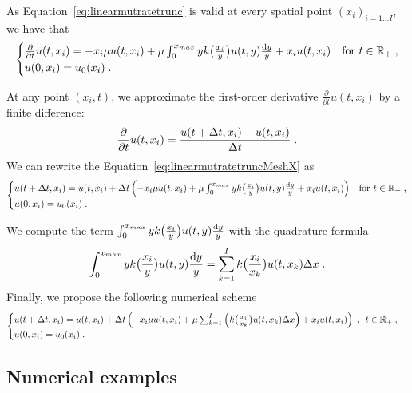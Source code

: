 \documentclass[11pt]{amsart}
\begin{document}
As Equation~\eqref{eq:linearmutratetrunc} is valid at every spatial point $(x_i)_{i = 1 \ldots I}$, we have that
\begin{equation}
    \begin{cases}
    \frac{\partial}{\partial t}u(t,x_i) = - x_i\mu u(t,x_i) + \mu \int_{0}^{x_{max}} y k\big( \frac{x_i}{y}\big) u(t,y) \frac{\mathrm dy}{y} + x_iu(t,x_i)
	& \text{for }t \in \mathbb{R}_+ \; ,
    \\
    u(0, x_i) = u_0(x_i)
    \; .
    \end{cases}
    \label{eq:linearmutratetruncMeshX}
\end{equation}


At any point $(x_i, t)$, we approximate the first-order derivative $\frac{\partial}{\partial t}u(t,x_i)$ by a finite difference:
$$\frac{\partial}{\partial t}u(t,x_i) = \frac{u(t+\Delta t,x_i) - u(t,x_i)}{\Delta t}
\; .$$
We can rewrite the Equation~\eqref{eq:linearmutratetruncMeshX} as
\begin{equation}
    \begin{cases}
    u(t+\Delta t,x_i) = u(t,x_i) + \Delta t \left(- x_i\mu u(t,x_i) + \mu \int_{0}^{x_{max}} y k\big( \frac{x_i}{y}\big) u(t,y) \frac{\mathrm dy}{y} + x_iu(t,x_i) \right)
	
	& \text{for }t \in \mathbb{R}_+ \; ,
	\\ 
	u(0, x_i) = u_0(x_i)
	\; .
    \end{cases}
    \label{eq:linearmutratetruncMeshXX}
\end{equation}

We compute the term $\int_{0}^{x_{max}} y k\big( \frac{x_i}{y}\big) u(t,y) \frac{\mathrm dy}{y}$ with the quadrature formula
$$ \int_{0}^{x_{max}} y k\big( \frac{x_i}{y}\big) u(t,y) \frac{\mathrm dy}{y}
= \sum_{k = 1}^I k \big( \frac{x_i}{x_k}\big) u(t,x_k) \Delta x \; .
$$ 
Finally, we propose the following numerical scheme
\begin{equation}
    \begin{cases}
    u(t+\Delta t,x_i) = u(t,x_i) + \Delta t \left(- x_i\mu u(t,x_i) + \mu \sum_{k = 1}^I \left(k \big( \frac{x_i}{x_k}\big) u(t,x_k) \Delta x \right) + x_iu(t,x_i) \right)
	\; , \enspace
	 t \in \mathbb{R}_+ \; ,
     \\
	u(0, x_i) = u_0(x_i)
    \; .
    \end{cases}
    \label{eq:numericalScheme}
\end{equation}

\subsection{Numerical examples} \mbox{}
\end{document}
